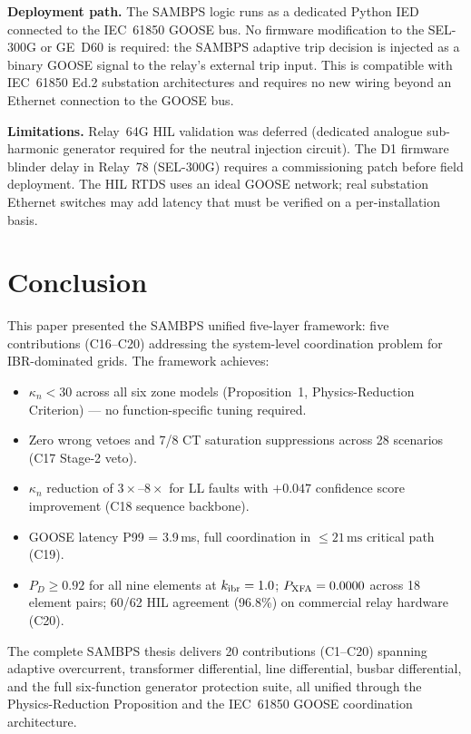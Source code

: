 \documentclass[journal,twoside]{IEEEtran}
\begin{document}
\textbf{Deployment path.}
The SAMBPS logic runs as a dedicated Python IED connected to the IEC~61850
GOOSE bus.
No firmware modification to the SEL-300G or GE~D60 is required: the SAMBPS
adaptive trip decision is injected as a binary GOOSE signal to the relay's
external trip input.
This is compatible with IEC~61850 Ed.2 substation architectures and requires
no new wiring beyond an Ethernet connection to the GOOSE bus.

\textbf{Limitations.}
Relay~64G HIL validation was deferred (dedicated analogue sub-harmonic
generator required for the neutral injection circuit).
The D1 firmware blinder delay in Relay~78 (SEL-300G) requires a commissioning
patch before field deployment.
The HIL RTDS uses an ideal GOOSE network; real substation Ethernet switches
may add latency that must be verified on a per-installation basis.

\section{Conclusion}
\label{sec:conclusion}

This paper presented the SAMBPS unified five-layer framework: five contributions
(C16--C20) addressing the system-level coordination problem for IBR-dominated
grids.
The framework achieves:
\begin{itemize}
  \item $\kappa_n < 30$ across all six zone models (Proposition~1,
        Physics-Reduction Criterion) --- no function-specific tuning required.
  \item Zero wrong vetoes and 7/8 CT saturation suppressions across 28 scenarios
        (C17 Stage-2 veto).
  \item $\kappa_n$ reduction of $3\times$--$8\times$ for LL faults with
        $+0.047$ confidence score improvement (C18 sequence backbone).
  \item GOOSE latency P99 = 3.9\,ms, full coordination in $\leq 21\,\text{ms}$
        critical path (C19).
  \item $P_D \geq 0.92$ for all nine elements at $k_{\rm ibr} = 1.0$;
        $P_{\rm XFA} = 0.0000$ across 18 element pairs; 60/62 HIL agreement
        (96.8\%) on commercial relay hardware (C20).
\end{itemize}

The complete SAMBPS thesis delivers 20 contributions (C1--C20) spanning adaptive
overcurrent, transformer differential, line differential, busbar differential, and
the full six-function generator protection suite, all unified through the
Physics-Reduction Proposition and the IEC~61850 GOOSE coordination architecture.



\end{document}
